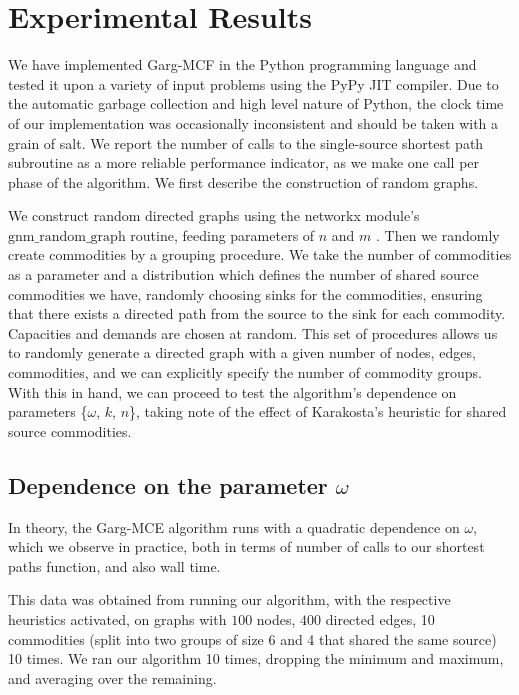 \section{Experimental Results}

We have implemented Garg-MCF in the Python programming language and tested it upon a variety of input problems using the
PyPy JIT compiler. Due to the automatic garbage collection and high level nature of Python, the clock time of our
implementation was occasionally inconsistent and should be taken with a grain of salt. We report the number of calls to
the single-source shortest path subroutine as a more reliable performance indicator, as we make one call per phase of
the algorithm. We first describe the construction of random graphs.

We construct random directed graphs using the networkx module's $\mathrm{gnm\_random\_graph}$ routine, feeding
parameters of $n$ and $m$ \cite{networkx}. Then we randomly create commodities by a grouping procedure. We take the
number of commodities as a parameter and a distribution which defines the number of shared source commodities we have,
randomly choosing sinks for the commodities, ensuring that there exists a directed path from the source to the sink for
each commodity. Capacities and demands are chosen at random. This set of procedures allows us to randomly generate a
directed graph with a given number of nodes, edges, commodities, and we can explicitly specify the number of commodity
groups. With this in hand, we can proceed to test the algorithm's dependence on parameters \{$\omega$, $k$, $n$\},
taking note of the effect of Karakosta's heuristic for shared source commodities.

\subsection{Dependence on the parameter $\omega$}

In theory, the Garg-MCE algorithm runs with a quadratic dependence on $\omega$, which we observe in practice, both in
terms of number of calls to our shortest paths function, and also wall time.


This data was obtained from running our algorithm, with the respective heuristics activated, on graphs with $100$
nodes, $400$ directed edges, 10 commodities (split into two groups of size 6 and 4 that shared the same source) 10
times. We ran our algorithm 10 times, dropping the minimum and maximum, and averaging over the remaining.

